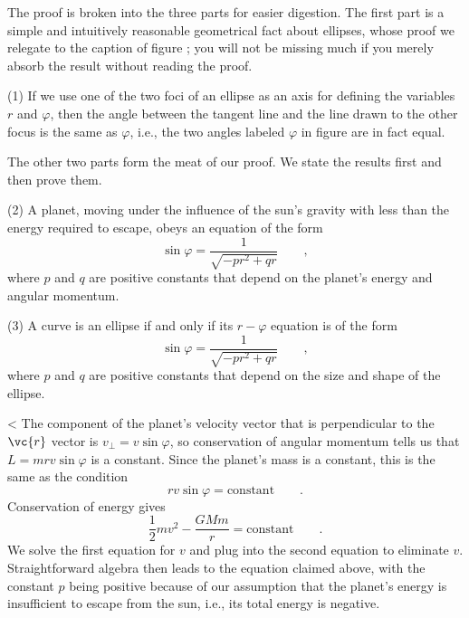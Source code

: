 The proof is broken into the three parts for easier
digestion. The first part is a simple and intuitively
reasonable geometrical fact about ellipses, whose proof we
relegate to the caption of figure ; you will not be missing
much if you merely absorb the result without reading the proof.

(1) If we use one of the two foci of an ellipse as an axis
for defining the variables $r$ and $\varphi $, then the angle
between the tangent line and the line drawn to the other
focus is the same as $\varphi $, i.e., the two angles labeled
$\varphi $ in figure  are in fact equal.

The other two parts form the meat of our proof. We state the
results first and then prove them.

(2) A planet, moving under the influence of the sun's
gravity with less than the energy required to escape, obeys
an equation of the form
\begin{equation*}
 \sin\varphi = \frac{1}{\sqrt{-pr^2+qr}}\qquad ,
\end{equation*}
 where $p$ and $q$  are positive constants that depend on the planet's
 energy and angular momentum.

(3) A curve is an ellipse if and only if its $r-\varphi $
equation is of the form
\begin{equation*}
 \sin\varphi = \frac{1}{\sqrt{-pr^2+qr}}\qquad ,
\end{equation*}
where $p$ and $q$ are positive constants that depend on the size and
shape of the ellipse.

<%
The component of the planet's velocity vector that is
perpendicular to the $\vc{r}$ vector is $v_\perp=v \sin \varphi $, so
conservation of angular momentum tells us that $L=mrv \sin\varphi$
is a constant. Since the planet's
mass is a constant, this is the same as the condition
\begin{equation*}
                rv \sin  \varphi  =  \text{constant}   \qquad   .
\end{equation*}
Conservation of energy gives
\begin{equation*}
                \frac{1}{2}mv^2-\frac{GMm}{r}          =  \text{constant}   \qquad   .
\end{equation*}
We solve the first equation for $v$ and plug into the second
equation to eliminate $v$. Straightforward algebra then
leads to the equation claimed above, with the constant $p$
being positive because of our assumption that the planet's
energy is insufficient to escape from the sun, i.e., its
total energy is negative.

